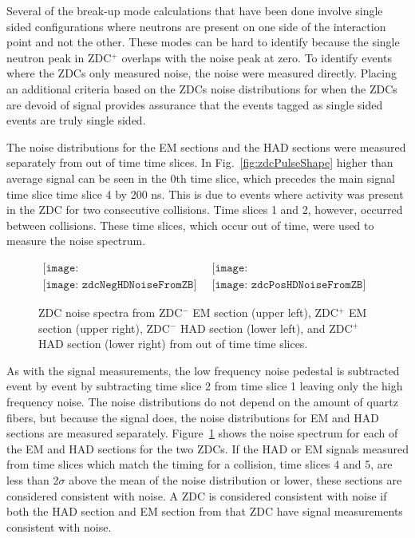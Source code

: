       Several of the break-up mode calculations that have been done involve
        single sided configurations where neutrons are present on one side
        of the interaction point and not the other.
      These modes can be hard to identify because the single neutron peak in 
        ZDC$^{+}$ overlaps with the noise peak at zero.
      To identify events where the ZDCs only measured noise, the noise
        \DIFdelbegin {}\DIFdelend \DIFaddbegin {}\DIFaddend were measured directly.
      Placing an additional criteria based on the ZDCs noise distributions for
        when the ZDCs are devoid of signal provides assurance that the events 
        tagged as single sided events are truly single sided.

      
      The noise distributions for the EM sections and the HAD sections were
        measured separately from out of time time slices.
      In Fig.~\ref{fig:zdcPulseShape} higher than average signal can be seen
        in the 0th time slice, which precedes the main signal time slice 
        time slice 4 by 200 ns. 
      This is due to events where activity was present in the ZDC for 
        two consecutive collisions.
      Time slices 1 and 2, however, occurred between collisions.
      These time slices, which occur out of time, were used to measure the 
        noise spectrum.
      \begin{figure}[!Hhbt]
        \centering
        $ \begin{array}{cc}
          \texttt{[image: zdcNegEMNoiseFromZBNoCor]} & 
          \texttt{[image: zdcPosEMNoiseFromZBNoCor]} \\
          \texttt{[image: zdcNegHDNoiseFromZB]} &
          \texttt{[image: zdcPosHDNoiseFromZB]}
        \end{array} $
        \caption{ZDC noise spectra from ZDC$^{-}$ EM section (upper left), 
          ZDC$^{+}$ EM section (upper right), ZDC$^{-}$ HAD section (lower left), 
          and ZDC$^{+}$ HAD section (lower right) from out of time time slices.}
        \label{fig:zdcNoiseSpectra}
      \end{figure}

      As with the signal measurements, the low frequency noise pedestal is 
        subtracted event by event by subtracting time slice 2 from time slice
        1 leaving only the high frequency noise.
      The noise distributions do not depend on the amount of quartz fibers, but
        because the signal does, the noise distributions for EM and HAD sections
        are measured separately.
      Figure~\ref{fig:zdcNoiseSpectra} shows the noise spectrum for each of the 
        EM and HAD sections for the two ZDCs.
      If the HAD or EM signals measured from time slices which match the 
        timing for a collision, time slices 4 and 5, are less than 2$\sigma$ 
        above the mean of the noise distribution or lower, these sections are 
        considered consistent with noise.
      A ZDC is considered consistent with noise if both the HAD section and EM 
        section from that ZDC have signal measurements consistent with noise.

